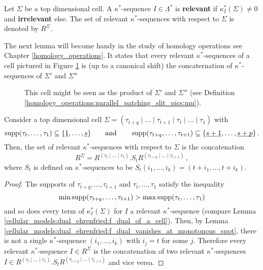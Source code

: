 \begin{defi}
    \label{cellular_models:dual_ehrenfried:relevant_kappa_dual_sequences}
    Let $\Sigma$ be a top dimensional cell.
    A $\kappa^\ast$-sequence $I \in \Lambda^\ast$ is {\bfseries relevant} if $\kappa^\ast_I(\Sigma) \neq 0$ and {\bfseries irrelevant} else.
    The set of relevant $\kappa^\ast$-sequences with respect to $\Sigma$ is denoted by $R^\Sigma$.
\end{defi}

The next lemma will become handy in the study of homology operations see Chapter \ref{homology_operations}.
It states that every relevant $\kappa^\ast$-sequences of a cell pictured in Figure \ref{cellular_models:dual_ehrenfried:motivate_lemma_for_multiplication}
is (up to a canonical shift) the concaternation of $\kappa^\ast$-sequences of $\Sigma'$ and $\Sigma''$
\begin{figure}[ht]
\centering
{}
\caption{\label{cellular_models:dual_ehrenfried:motivate_lemma_for_multiplication}This cell might be seen as the product of $\Sigma'$ and $\Sigma''$ (see Definition \ref{homology_operations:parallel_patching_slit_pics:mu}).}
\end{figure}

\begin{lem}
    \label{cellular_models:dual_ehrenfried:relevant_kappa_dual_sequences_of_blocks}
    Consider a top dimensional cell $\Sigma = (\tau_{t+q} \mid \ldots \mid \tau_{t+1} \mid \tau_t \mid \ldots \mid \tau_1)$ with
    \[
        \supp(\tau_t, \ldots, \tau_1) \subseteq \{ \ul 1, \ldots, \ul s \} \mspc{and}{20} \supp(\tau_{t+q}, \ldots, \tau_{t+1}) \subseteq \{ \ul{s+1}, \ldots, \ul{s+p} \} \,.
    \]
    Then, the set of relevant $\kappa^\ast$-sequences with respect to $\Sigma$ is the concatenation
    \[
        R^\Sigma = R^{(\tau_t \mid \ldots \mid \tau_1)}.S_tR^{(\tau_{t+q} \mid \ldots \mid \tau_{t+1})} \,,
    \]
    where $S_t$ is defined on $\kappa^\ast$-sequences to be $S_t( i_1, \ldots, i_k ) = (t+i_1, \ldots, t+i_k)$.
\end{lem}

\begin{proof}
    The supports of $\tau_{t+q}, \ldots, \tau_{t+1}$ and $\tau_t, \ldots, \tau_1$ satisfy the inequality
    \[
         \min\supp(\tau_{t+q}, \ldots, \tau_{t+1})  > \max\supp(\tau_t, \ldots, \tau_1)
    \]
    and so does every term of $\kappa^\ast_I (\Sigma)$ for $I$ a relevant $\kappa^\ast$-sequence (compare Lemma \ref{cellular_models:dual_ehrenfried:f_dual_of_a_cell}).
    Then, by Lemma \ref{cellular_models:dual_ehrenfried:f_dual_vanishes_at_monotonous_spot}, there is not a single $\kappa^\ast$-sequence $(i_1, \ldots, i_k)$ with $i_j = t$ for some $j$.
    Therefore every relevant $\kappa^\ast$-sequence $I \in R^\Sigma$ is the concatenation of two relevant $\kappa^\ast$-sequences $I \in R^{(\tau_t \mid \ldots \mid \tau_1)}.S_tR^{(\tau_{t+q} \mid \ldots \mid \tau_{t+1})}$ and vice versa.
\end{proof}
